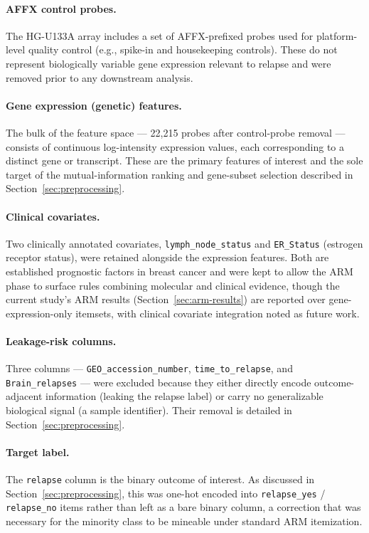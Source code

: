 \documentclass[twocolumn]{article}
\begin{document}
\paragraph{AFFX control probes.} The HG-U133A array includes a set of AFFX-prefixed
probes used for platform-level quality control (e.g., spike-in and housekeeping
controls). These do not represent biologically variable gene expression relevant to
relapse and were removed prior to any downstream analysis.

\paragraph{Gene expression (genetic) features.} The bulk of the feature space —
22{,}215 probes after control-probe removal — consists of continuous log-intensity
expression values, each corresponding to a distinct gene or transcript. These are the
primary features of interest and the sole target of the mutual-information ranking
and gene-subset selection described in Section~\ref{sec:preprocessing}.

\paragraph{Clinical covariates.} Two clinically annotated covariates,
\texttt{lymph\_node\_status} and \texttt{ER\_Status} (estrogen receptor status), were
retained alongside the expression features. Both are established prognostic factors
in breast cancer and were kept to allow the ARM phase to surface rules combining
molecular and clinical evidence, though the current study's ARM results
(Section~\ref{sec:arm-results}) are reported over gene-expression-only itemsets, with
clinical covariate integration noted as future work.

\paragraph{Leakage-risk columns.} Three columns — \texttt{GEO\_accession\_number},
\texttt{time\_to\_relapse}, and \texttt{Brain\_relapses} — were excluded because they
either directly encode outcome-adjacent information (leaking the relapse label) or
carry no generalizable biological signal (a sample identifier). Their removal is
detailed in Section~\ref{sec:preprocessing}.

\paragraph{Target label.} The \texttt{relapse} column is the binary outcome of
interest. As discussed in Section~\ref{sec:preprocessing}, this was one-hot encoded
into \texttt{relapse\_yes} / \texttt{relapse\_no} items rather than left as a bare
binary column, a correction that was necessary for the minority class to be mineable
under standard ARM itemization.
\end{document}
